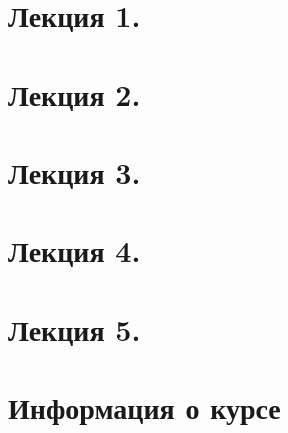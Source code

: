 \newpage
\section{Лекция 1.}


\newpage
\section{Лекция 2.}


\newpage
\section{Лекция 3.}


\newpage
\section{Лекция 4.}


\newpage
\section{Лекция 5.}



\newpage
\section{Информация о курсе}
